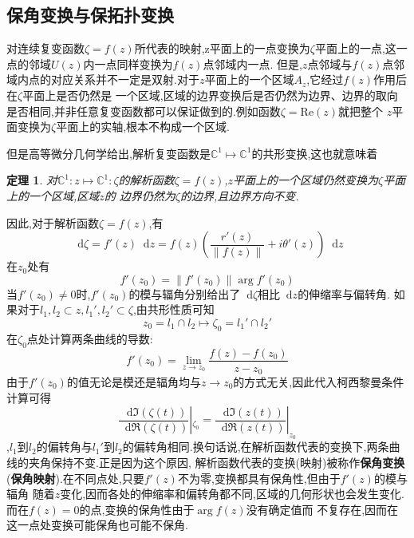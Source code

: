 \documentclass[UTF8]{ctexart}
\newcommand{\dif}{\mathop{}\!\mathrm{d}}
\newtheorem{theorem}{定理}
\begin{document}
\subsection{保角变换与保拓扑变换}
对连续复变函数$\zeta=f(z)$所代表的映射,z平面上的一点变换为$\zeta$平面上的一点,这一点的邻域$U(z)$内一点同样变换为$f(z)$点邻域内一点.
但是,$z$点邻域与$f(z)$点邻域内点的对应关系并不一定是双射.对于$z$平面上的一个区域$A_{z}$,它经过$f(z)$作用后在$\zeta$平面上是否仍然是
一个区域,区域的边界变换后是否仍然为边界、边界的取向是否相同,并非任意复变函数都可以保证做到的.例如函数$\zeta=\mathrm{Re}(z)$就把整个
$z$平面变换为$\zeta$平面上的实轴,根本不构成一个区域.

但是高等微分几何学给出,解析复变函数是$\mathbb{C}^{1}\mapsto\mathbb{C}^{1}$的共形变换,这也就意味着
\begin{theorem}
  对$\mathbb{C}^{1}:z\mapsto\mathbb{C}^{1}:\zeta$的解析函数$\zeta=f(z)$,$z$平面上的一个区域仍然变换为$\zeta$平面上的一个区域,区域$z$的
  边界仍然为$\zeta$的边界,且边界方向不变.
\end{theorem}

因此,对于解析函数$\zeta=f(z)$,有
\begin{equation}
  \dif\zeta=f'(z)\dif z=f(z) \left(\frac{r'(z)}{\| f(z)\| }+i \theta '(z)\right)\dif z
\end{equation}
在$z_{0}$处有
\begin{equation}
  f'(z_{0})=\left\| f'(z_{0}) \right\|\arg f'(z_{0})
\end{equation}
当$f'(z_{0})\not=0$时,$f'(z_{0})$的模与辐角分别给出了$\dif\zeta$相比$\dif z$的伸缩率与偏转角.
如果对于$l_{1},l_{2}\subset z,l_{1}',l_{2}'\subset \zeta$,由共形性质可知
\begin{equation}
  z_{0}=l_{1}\cap l_{2}\mapsto\zeta_{0}=l_{1}'\cap l_{2}'
\end{equation}
在$\zeta_{0}$点处计算两条曲线的导数:
\begin{equation}
  f'(z_{0})=\lim_{z\rightarrow z_{0}}\frac{f(z)-f(z_{0})}{z-z_{0}}
\end{equation}
由于$f'(z_{0})$的值无论是模还是辐角均与$z\rightarrow z_{0}$的方式无关,因此代入柯西黎曼条件计算可得
\begin{equation}
  \frac{\dif \Im (\zeta(t))}{\dif\Re (\zeta(t))}|_{\zeta_{0}}=\frac{\dif \Im (z(t))}{\dif\Re (z(t))}|_{z_{0}}
\end{equation}
,$l_{1}$到$l_{2}$的偏转角与$l_{1}'$到$l_{2}$的偏转角相同.换句话说,在解析函数代表的变换下,两条曲线的夹角保持不变.正是因为这个原因,
解析函数代表的变换(映射)被称作\textbf{保角变换}(\textbf{保角映射}).在不同点处,只要$f'(z)$不为零,变换都具有保角性,但由于$f'(z)$的模与辐角
随着$z$变化,因而各处的伸缩率和偏转角都不同,区域的几何形状也会发生变化.而在$f(z)=0$的点,变换的保角性由于$\arg f(z)$没有确定值而
不复存在,因而在这一点处变换可能保角也可能不保角.
\end{document}
